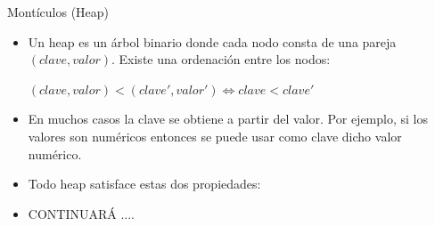 \documentclass[10pt,envcountsect,spanish]{beamer}
\begin{document}
\begin{frame}{Montículos (Heap)}


\begin{itemize}
\item Un heap es un árbol binario donde cada nodo consta de una pareja $(clave, valor)$. Existe una ordenación entre los nodos:
\centerline{$(clave, valor) <  (clave', valor') \Leftrightarrow  clave < clave'$} 
 
\item En muchos casos la clave se obtiene a partir del valor. Por ejemplo, si los valores son numéricos entonces se puede usar como clave dicho valor numérico.

\item Todo heap satisface estas dos propiedades:


\item CONTINUARÁ ....
\end{itemize}

\end{frame}
\end{document}
